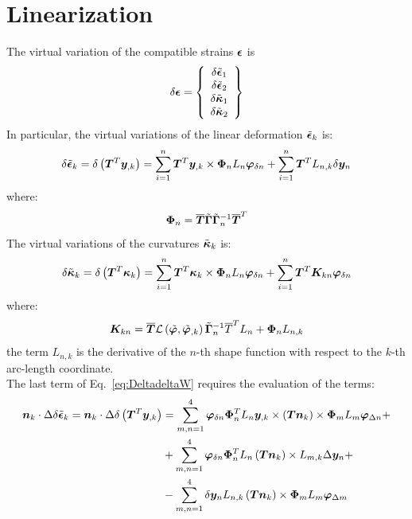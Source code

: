 \section{Linearization}
The virtual variation of the compatible strains $\T{\epsilon}$ is
\begin{equation}
\delta \T{\epsilon} =
\cubr{\vvect{c}{
\delta \tilde{\T{\epsilon} }_1 \\
\delta \tilde{\T{\epsilon} }_2 \\
\delta \tilde{\T{\kappa} }_1 \\
\delta \tilde{\T{\kappa} }_2 \\
}}
\end{equation}
In particular, the virtual variations of the linear deformation $\tilde{\T{\epsilon} }_k $ is:
\begin{equation}
\delta \tilde{\T{\epsilon} }_k  = \delta \plbr{ \TT{T}^T \T{y}_{,k} } =
\sum_{i=1}^n \TT{T}^T \T{y}_{,k} \times \TT{\Phi}_{n} L_n \T{\varphi}_{\delta n} + \sum_{i=1}^n \TT{T}^T L_{n,k} \delta \T{y}_{n}
\label{eq:delta_epsilon}
\end{equation}
where:
\begin{equation}
\TT{\Phi}_{n} = \overline{\TT{T}}  \tilde{ \TT{\Gamma} } \tilde{ \TT{\Gamma} }_n^{-1} \overline{\TT{T}}^T
\end{equation}
The  virtual variations of the curvatures $\tilde{\T{\kappa} }_k$ is:
\begin{equation}
\delta \tilde{\T{\kappa} }_k = \delta \plbr{ \TT{T}^T \T{\kappa}_k } =
\sum_{i=1}^n \TT{T}^T \T{\kappa}_k \times \TT{\Phi}_n L_n \T{\varphi}_{\delta n} + \sum_{i=1}^n \TT{T}^T \TT{K}_{kn} \T{\varphi}_{\delta n}
\label{eq:delta_k}
\end{equation}
where:
\begin{equation}
\TT{K}_{kn} = \overline{\TT{T}} \mathcal{L} \plbr{ \tilde{\T{\varphi}}, \tilde{\T{\varphi}}_{,k} } \tilde{ \TT{\Gamma} }_{n}^{-1} \overline{T}^T L_n + \TT{\Phi}_{n} L_{n,k}
\end{equation}
the term $L_{n,k}$ is the derivative of the $n$-th shape function with respect to the $k$-th arc-length coordinate.\\
The last term of Eq.~\ref{eq:DeltadeltaW} requires the evaluation of the terms:
\begin{equation}
\begin{split}
\T{n}_k \cdot \Delta \delta \tilde{\T{\epsilon}}_k =
\T{n}_k \cdot \Delta \delta \plbr{ \TT{T}^T \T{y}_{,k} } & =
\sum_{m,n=1}^{4} \T{\varphi}_{\delta n} \TT{\Phi}_{n}^T L_n \T{y}_{,k} \times \plbr{ \TT{T} \T{n}_k } \times \TT{\Phi}_m L_m  \T{\varphi}_{\Delta n} + \\
& + \sum_{m,n=1}^{4} \T{\varphi}_{\delta n} \TT{\Phi}_{n}^T L_n \plbr{\TT{T} \T{n}_k} \times L_{m,k} \Delta \T{y}_{n} + \\
& - \sum_{m,n=1}^{4} \delta \T{y}_n L_{n,k} \plbr{\TT{T} \T{n}_k} \times \TT{\Phi}_m L_m \T{\varphi}_{\Delta m}
\end{split}
\label{eq:Deltadelta_epsilon}
\end{equation}
